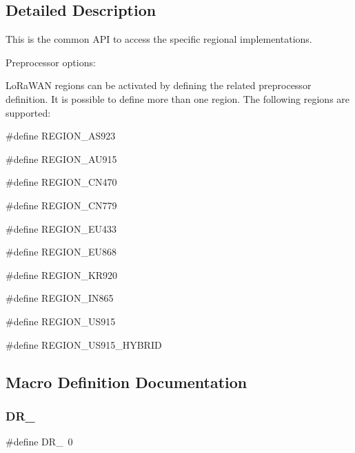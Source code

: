 \subsection{Detailed Description}
This is the common A\+PI to access the specific regional implementations.

Preprocessor options\+:
\begin{DoxyItemize}
\item Lo\+Ra\+W\+AN regions can be activated by defining the related preprocessor definition. It is possible to define more than one region. The following regions are supported\+:
\begin{DoxyItemize}
\item \#define R\+E\+G\+I\+O\+N\+\_\+\+A\+S923
\item \#define R\+E\+G\+I\+O\+N\+\_\+\+A\+U915
\item \#define R\+E\+G\+I\+O\+N\+\_\+\+C\+N470
\item \#define R\+E\+G\+I\+O\+N\+\_\+\+C\+N779
\item \#define R\+E\+G\+I\+O\+N\+\_\+\+E\+U433
\item \#define R\+E\+G\+I\+O\+N\+\_\+\+E\+U868
\item \#define R\+E\+G\+I\+O\+N\+\_\+\+K\+R920
\item \#define R\+E\+G\+I\+O\+N\+\_\+\+I\+N865
\item \#define R\+E\+G\+I\+O\+N\+\_\+\+U\+S915
\item \#define R\+E\+G\+I\+O\+N\+\_\+\+U\+S915\+\_\+\+H\+Y\+B\+R\+ID 
\end{DoxyItemize}
\end{DoxyItemize}

\subsection{Macro Definition Documentation}
\mbox{\label{group__REGION_ga6c4ef966b4f3d5eb7597b087f2b97095}} 
\subsubsection{\texorpdfstring{D\+R\+\_}{DR\_0}}
{\footnotesize\ttfamily \#define D\+R\+\_~0}

